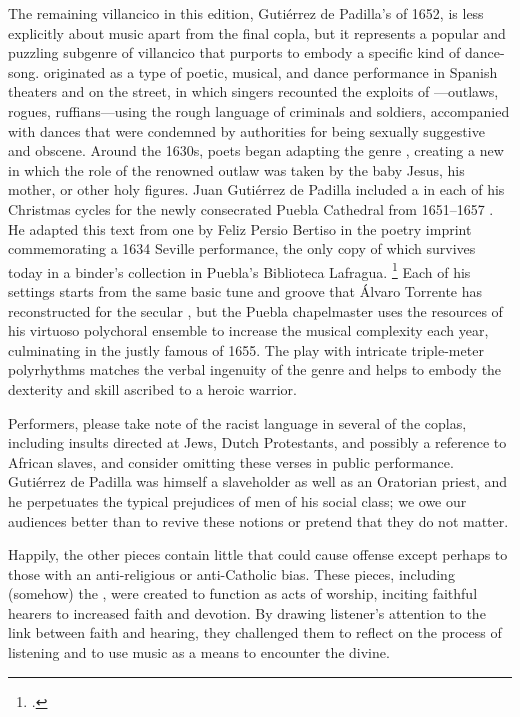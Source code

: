 The remaining villancico in this edition, Gutiérrez de Padilla's 
of 1652, is less explicitly about music apart from the final copla, but it
represents a popular and puzzling subgenre of villancico that purports to
embody a specific kind of dance-song.
 originated as a type of poetic, musical, and dance performance
in Spanish theaters and on the street, in which singers recounted the exploits
of ---outlaws, rogues, ruffians---using the rough language of
criminals and soldiers, accompanied with dances that were condemned by
authorities for being sexually suggestive and obscene.%
    \citXXX[Torrente]
Around the 1630s, poets began adapting the genre , creating
a new  in which the role of the renowned outlaw
was taken by the baby Jesus, his mother, or other holy figures.
Juan Gutiérrez de Padilla included a  in each of his Christmas
cycles for the newly consecrated Puebla Cathedral from 1651--1657
\XXX[check].%
    \citXXX[recording]
He adapted this text from one by Feliz Persio Bertiso in the poetry imprint
commemorating a 1634 Seville performance, the only copy of which survives
today in a binder's collection in Puebla's Biblioteca Lafragua.%
    \footnote{\signature{MEX-Plf: 80070-42010404}.}
Each of his settings starts from the same basic tune and groove that Álvaro
Torrente has reconstructed for the secular , but the Puebla
chapelmaster uses the resources of his virtuoso polychoral ensemble to
increase the musical complexity each year, culminating in the justly famous
 of 1655.
The play with intricate triple-meter polyrhythms matches the verbal ingenuity
of the genre and helps to embody the dexterity and skill ascribed to a 
heroic warrior.

Performers, please take note of the racist language in several of the
coplas, including insults directed at Jews, Dutch Protestants, and possibly a
reference to African slaves, and consider omitting these verses in public
performance.
Gutiérrez de Padilla was himself a slaveholder as well as an Oratorian priest,
and he perpetuates the typical prejudices of men of his social class; we owe
our audiences better than to revive these notions or pretend that they do not
matter.%
    \citXXX[sources]

Happily, the other pieces contain little that could cause offense except
perhaps to those with an anti-religious or anti-Catholic bias. 
These pieces, including (somehow) the , were created to function
as acts of worship, inciting faithful hearers to increased faith and devotion.
By drawing listener's attention to the link between faith and hearing, they
challenged them to reflect on the process of listening and to use music as a
means to encounter the divine.

